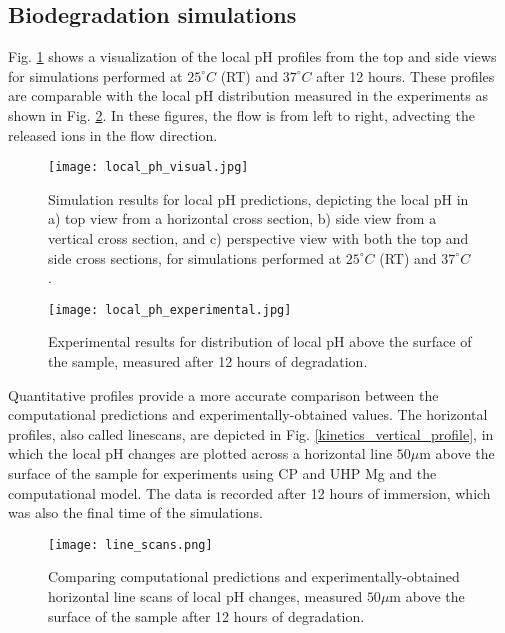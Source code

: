 \subsection{Biodegradation simulations}

Fig. \ref{fig:kinetics_local_ph_visual} shows a visualization of the local pH profiles from the top and side views for simulations performed at  $25^{\circ}C$ (RT) and $37^{\circ}C$ after 12 hours. These profiles are comparable with the local pH distribution measured in the experiments as shown in Fig. \ref{fig:kinetics_local_ph_experimental}. In these figures, the flow is from left to right, advecting the released ions in the flow direction.

\begin{figure}[h]
\centering
\medskip
\texttt{[image: local\_ph\_visual.jpg]}
\caption[Simulation results for local pH predictions]{Simulation results for local pH predictions, depicting the local pH in a) top view from a horizontal cross section, b) side view from a vertical cross section, and c) perspective view with both the top and side cross sections, for simulations performed at $25^{\circ}C$ (RT) and $37^{\circ}C$.} \label{fig:kinetics_local_ph_visual}
\end{figure}

\begin{figure}[h]
\centering
\medskip
\texttt{[image: local\_ph\_experimental.jpg]}
\caption[Experimental results for distribution of local pH above the sample]{Experimental results for distribution of local pH above the surface of the sample, measured after 12 hours of degradation.} \label{fig:kinetics_local_ph_experimental}
\end{figure}

Quantitative profiles provide a more accurate comparison between the computational predictions and experimentally-obtained values. The horizontal profiles, also called linescans, are depicted in Fig. \ref{kinetics_vertical_profile}, in which the local pH changes are plotted across a horizontal line $50 \mu\mathrm{m}$ above the surface of the sample for experiments using CP and UHP Mg and the computational model. The data is recorded after 12 hours of immersion, which was also the final time of the simulations.

\begin{figure}[h]
\centering
\medskip
\texttt{[image: line\_scans.png]}
\caption[Comparing computational and experimental for horizontal line scans of local pH]{Comparing computational predictions and experimentally-obtained  horizontal line scans of local pH changes, measured $50 \mu\mathrm{m}$ above the surface of the sample after 12 hours of degradation.} \label{fig:kinetics_line_scans}
\end{figure}

